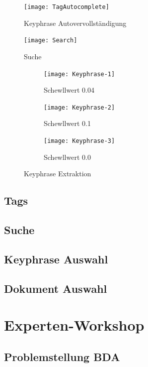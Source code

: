 \begin{figure}[ht]
\centering
\texttt{[image: TagAutocomplete]}
\caption{Keyphrase Autovervollständigung}
\label{fig:addtagautocomplete}
\end{figure}


\begin{figure}[ht]
\centering
\texttt{[image: Search]}
\caption{Suche}
\label{fig:external-search}
\end{figure}



\begin{figure}[htbp]
    \centering
    \begin{subfigure}[b]{0.6\textwidth}
    \texttt{[image: Keyphrase-1]}
    \caption{Schewllwert 0.04}
    \label{fig:meta-config}
    \end{subfigure}
     \begin{subfigure}[b]{0.6\textwidth}
    \texttt{[image: Keyphrase-2]}
    \caption{Schewllwert 0.1}
    \label{fig:global-config}
    \end{subfigure}
     \begin{subfigure}[b]{0.6\textwidth}
    \texttt{[image: Keyphrase-3]}
    \caption{Schewllwert 0.0}
    \label{fig:sftp-config}
    \end{subfigure}
    \caption{Keyphrase Extraktion}
\end{figure}

\subsection{Tags}

\subsection{Suche}

\subsection{Keyphrase Auswahl}

\subsection{Dokument Auswahl}

\section{Experten-Workshop}

\subsection{Problemstellung BDA}



